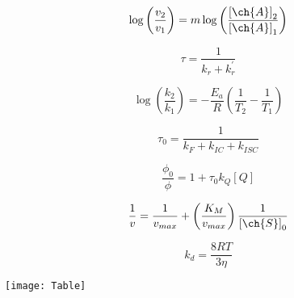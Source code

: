 \documentclass[12pt, letterpaper]{memoir}
\begin{document}
\begin{minipage}[t]{0.5\linewidth}
	\begin{equation*}
		\log\left(\frac{v_2}{v_1}\right)=m\log\left(\frac{\left[\ch{A}\right]_2}{\left[\ch{A}\right]_1}\right)
	\end{equation*}

	\begin{equation*}
		\tau = \dfrac{1}{k_r + k_r^\prime}
	\end{equation*}

	\begin{equation*}
		\log\left(\frac{k_2}{k_1}\right)=-\frac{E_a}{R}\left(\frac{1}{T_2}-\frac{1}{T_1}\right)
	\end{equation*}

	\begin{equation*}
		\tau_0=\dfrac{1}{k_F+k_{IC}+k_{ISC}}
	\end{equation*}

	\begin{equation*}
		\dfrac{\phi_{0}}{\phi} = 1 + \tau_0k_Q[Q]
	\end{equation*}

	\begin{equation*}
		\frac{1}{v}=\frac{1}{v_{max}}+\left(\frac{K_M}{v_{max}}\right)\frac{1}{\left[\ch{S}\right]_0}
	\end{equation*}

	\begin{equation*}
		k_d=\dfrac{8RT}{3\eta}
	\end{equation*}	
\end{minipage}

\begin{center}
\texttt{[image: Table]}
\end{center}
\end{document}
